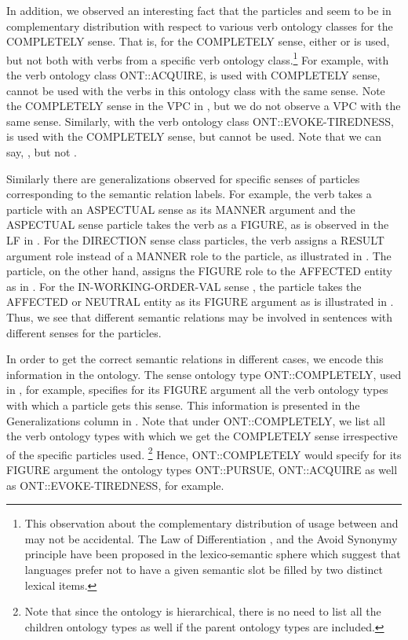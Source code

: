 \documentclass[output=paper,modfonts,nonflat]{langsci/langscibook}
\begin{document}
In addition, we observed an interesting fact that the particles  and  seem to be in complementary distribution with respect to various verb ontology classes for the COMPLETELY sense. That is, for the COMPLETELY sense, either  or  is used, but not both with verbs from a specific verb ontology class.\footnote{This observation about the complementary distribution of usage between  and  may not be accidental. The Law of Differentiation \citep{Pau90,Bre00}, and the Avoid Synonymy principle \citep{Kip83,Cla87} have been proposed in the lexico-semantic sphere which suggest that languages prefer not to have a given semantic slot be filled by two distinct lexical items.} For example, with the verb ontology class ONT::ACQUIRE,  is used with COMPLETELY sense,  cannot be used with the verbs in this ontology class with the same sense. Note the COMPLETELY sense in the VPC  in , but we do not observe a VPC  with the same sense. Similarly, with the verb ontology class ONT::EVOKE-TIREDNESS,  is used with the COMPLETELY sense, but  cannot be used. Note that we can say, , but not .

Similarly there are generalizations observed for specific senses of particles corresponding to the semantic relation labels. For example, the verb takes a particle with an ASPECTUAL sense as its MANNER argument and the ASPECTUAL sense particle takes the verb as a FIGURE, as is observed in the LF in . For the DIRECTION sense class particles, the verb assigns a RESULT argument role instead of a MANNER role to the particle, as illustrated in . The particle, on the other hand, assigns the FIGURE role to the AFFECTED entity as in . For the IN-WORKING-ORDER-VAL sense%
, the particle takes the AFFECTED or NEUTRAL entity as its FIGURE argument as is illustrated in . Thus, we see that different semantic relations may be involved in sentences with different senses for the particles.

In order to get the correct semantic relations in different cases, we encode this information in the ontology. The sense ontology type ONT::COMPLETELY, used in , for example, specifies for its FIGURE argument all the verb ontology types with which a particle gets this sense. This information is presented in %
the Generalizations column in . Note that %
under ONT::COMPLETELY, we list all the verb ontology types with which we get the COMPLETELY sense irrespective of the specific particles used.%
\footnote{Note that since the ontology is hierarchical, there is no need to list all the children ontology types as well if the parent ontology types are included.} Hence, ONT::COMPLETELY would specify for its FIGURE argument the ontology types ONT::PURSUE, ONT::ACQUIRE as well as ONT::EVOKE-TIREDNESS, for example. 
\end{document}
